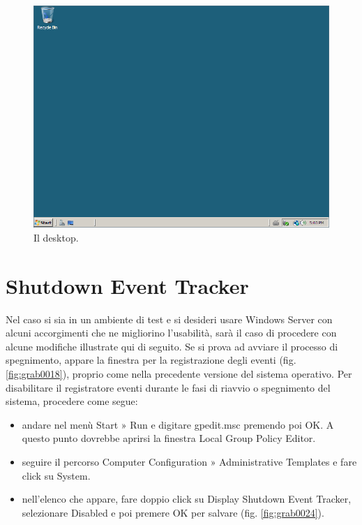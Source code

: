 \begin{figure}[htbp]
 \centering
 \includegraphics[scale=0.5]{images/grab0017}
 \caption{Il desktop.}
\label{fig:grab0017}
\end{figure}

\section{Shutdown Event Tracker}

Nel caso si sia in un ambiente di test e si desideri usare Windows Server con
alcuni accorgimenti che ne migliorino l’usabilità, sarà il caso di procedere
con alcune modifiche illustrate qui di seguito. Se si prova ad avviare il
processo di spegnimento, appare la finestra per la registrazione degli eventi
(fig. \ref{fig:grab0018}), proprio come nella precedente versione del sistema operativo. Per
disabilitare il registratore eventi durante le fasi di riavvio o spegnimento del
sistema, procedere come segue:

\begin{itemize}
    \item andare nel menù Start » Run e digitare gpedit.msc premendo poi OK.
A questo punto dovrebbe aprirsi la finestra Local Group Policy Editor.
    \item seguire il percorso Computer Configuration » Administrative Templates
e fare click su System.
    \item nell’elenco che appare, fare doppio click su Display Shutdown Event
Tracker, selezionare Disabled e poi premere OK per salvare (fig. \ref{fig:grab0024}).
\end{itemize}


